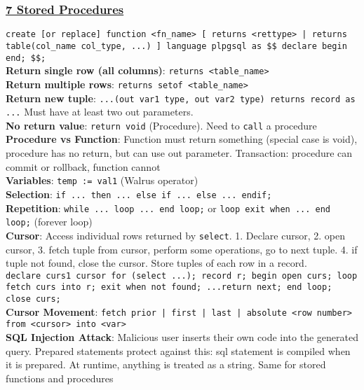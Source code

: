 \documentclass{article}
\begin{document}
{\begin{multicols*}{3}
\subsubsection*{\underline{7 Stored Procedures}}
\texttt{create [or replace] function <fn\_name> [ returns <rettype> | returns table(col\_name col\_type, ...) ] language plpgsql as \$\$ declare begin end; \$\$; }\\
\textbf{Return single row (all columns)}: \texttt{returns <table\_name>}\\
\textbf{Return multiple rows}: \texttt{returns setof <table\_name>}\\
\textbf{Return new tuple}: \texttt{...(out var1 type, out var2 type) returns record as ...} Must have at least two out parameters. \\
\textbf{No return value}: \texttt{return void} (Procedure). Need to \texttt{call} a procedure \\
\textbf{Procedure vs Function}: Function must return something (special case is void), procedure has no return, but can use out parameter. Transaction: procedure can commit or rollback, function cannot\\
\textbf{Variables}: \texttt{temp := val1} (Walrus operator) \\
\textbf{Selection}: \texttt{if ... then ... else if ... else ... endif;}\\
\textbf{Repetition}: \texttt{while ... loop ... end loop;} or \texttt{loop exit when ... end loop;} (forever loop) \\
\textbf{Cursor}: Access individual rows returned by \texttt{select}. 1. Declare cursor, 2. open cursor, 3. fetch tuple from cursor, perform some operations, go to next tuple. 4. if tuple not found, close the cursor. Store tuples of each row in a record. \\
\texttt{declare curs1 cursor for (select ...); record r; begin open curs; loop fetch curs into r; exit when not found; ...return next; end loop; close curs;}\\
\textbf{Cursor Movement}: \texttt{fetch prior | first | last | absolute <row number> from <cursor> into <var> }\\
\textbf{SQL Injection Attack}: Malicious user inserts their own code into the generated query. Prepared statements protect against this: sql statement is compiled when it is prepared. At runtime, anything is treated as a string. Same for stored functions and procedures 

\end{multicols*}}
\end{document}
